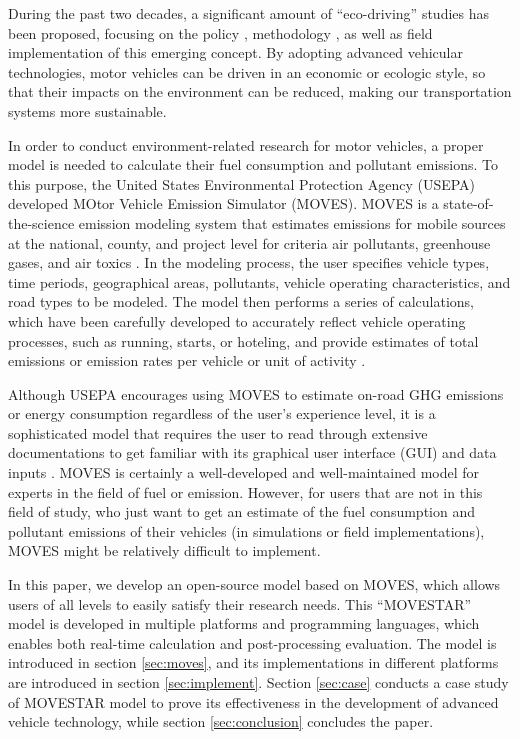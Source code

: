 \documentclass{article}
\begin{document}
    During the past two decades, a significant amount of ``eco-driving'' studies has been proposed, focusing on the policy \citep{barkenbus2010eco, sivak2012eco}, methodology \citep{barth2009energy, barth2011dynamic, katsaros2011performance}, as well as field implementation \citep{altan2017glidepath, hao2019eco, wang2019early} of this emerging concept. By adopting advanced vehicular technologies, motor vehicles can be driven in an economic or ecologic style, so that their impacts on the environment can be reduced, making our transportation systems more sustainable.
    
    In order to conduct environment-related research for motor vehicles, a proper model is needed to calculate their fuel consumption and pollutant emissions. To this purpose, the United States Environmental Protection Agency (USEPA) developed MOtor Vehicle Emission Simulator (MOVES). MOVES is a state-of-the-science emission modeling system that estimates emissions for mobile sources at the national, county, and project level for criteria air pollutants, greenhouse gases, and air toxics \citep{moves}. In the modeling process, the user specifies vehicle types, time periods, geographical areas, pollutants, vehicle operating characteristics, and road types to be modeled. The model then performs a series of calculations, which have been carefully developed to accurately reflect vehicle operating processes, such as running, starts, or hoteling, and provide estimates of total emissions or emission rates per vehicle or unit of activity \citep{moves2014aui}.
    
    Although USEPA encourages using MOVES to estimate on-road GHG emissions or energy consumption regardless of the user's experience level, it is a sophisticated model that requires the user to read through extensive documentations to get familiar with its graphical user interface (GUI) and data inputs \citep{usingmoves}. MOVES is certainly a well-developed and well-maintained model for experts in the field of fuel or emission. However, for users that are not in this field of study, who just want to get an estimate of the fuel consumption and pollutant emissions of their vehicles (in simulations or field implementations), MOVES might be relatively difficult to implement. 
    
    In this paper, we develop an open-source model based on MOVES, which allows users of all levels to easily satisfy their research needs. This ``MOVESTAR'' model is developed in multiple platforms and programming languages, which enables both real-time calculation and post-processing evaluation. The model is introduced in section \ref{sec:moves}, and its implementations in different platforms are introduced in section \ref{sec:implement}. Section \ref{sec:case} conducts a case study of MOVESTAR model to prove its effectiveness in the development of advanced vehicle technology, while section \ref{sec:conclusion} concludes the paper.
\end{document}
